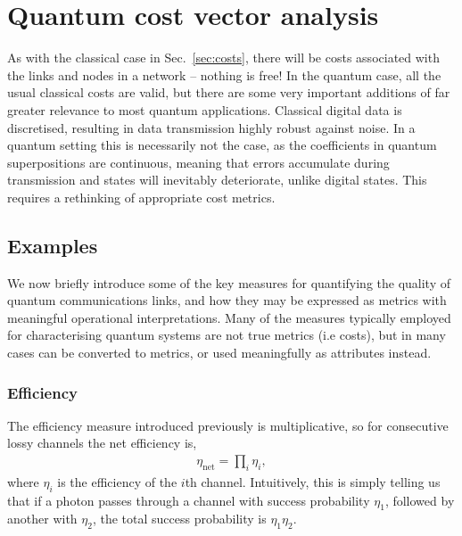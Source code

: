 %
%

\section{Quantum cost vector analysis} \label{sec:quantum_meas_cost}

As with the classical case in Sec.~\ref{sec:costs}, there will be costs associated with the links and nodes in a network -- nothing is free! In the quantum case, all the usual classical costs are valid, but there are some very important additions of far greater relevance to most quantum applications. Classical digital data is discretised, resulting in data transmission highly robust against noise. In a quantum setting this is necessarily not the case, as the coefficients in quantum superpositions are continuous, meaning that errors accumulate during transmission and states will inevitably deteriorate, unlike digital states. This requires a rethinking of appropriate cost metrics.


%
%

\subsection{Examples}

We now briefly introduce some of the key measures for quantifying the quality of quantum communications links, and how they may be expressed as metrics with meaningful operational interpretations. Many of the measures typically employed for characterising quantum systems are not true metrics (i.e costs), but in many cases can be converted to metrics, or used meaningfully as attributes instead.

%
%

\subsubsection{Efficiency} 

The efficiency measure introduced previously is multiplicative, so for consecutive lossy channels the net efficiency is,
\begin{align}
\eta_\text{net}=\prod_i \eta_i,
\end{align}
where $\eta_i$ is the efficiency of the $i$th channel. Intuitively, this is simply telling us that if a photon passes through a channel with success probability $\eta_1$, followed by another with $\eta_2$, the total success probability is \mbox{$\eta_1\eta_2$}.

